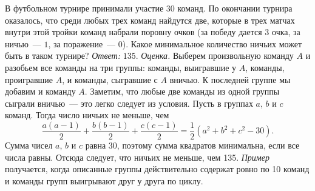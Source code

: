 \problem
В футбольном турнире принимали участие $30$ команд.
По окончании турнира оказалось, что среди любых трех команд найдутся две,
которые в трех матчах внутри этой тройки команд набрали поровну очков
(за победу дается $3$ очка, за ничью~--- $1$, за поражение~--- $0$).
Какое минимальное количество ничьих может быть в таком турнире?
\solution
\emph{Ответ:} $135$.
\emph{Оценка.}
Выберем произвольную команду $A$ и разобьем все команды на три группы:
команды, выигравшие у $A$, команды, проигравшие $A$, и команды, сыгравшие с
$A$ вничью.
К последней группе мы добавим и команду $A$.
Заметим, что любые две команды из одной группы сыграли вничью~--- это легко
следует из условия.
Пусть в группах $a$, $b$ и $c$ команд.
Тогда число ничьих не меньше, чем
\[
    \dfrac{a (a - 1)}{2} +
    \dfrac{b (b - 1)}{2} +
    \dfrac{c (c - 1)}{2}
=
    \dfrac{1}{2}(a^2 + b^2 + c^2 - 30)
.\]
Сумма чисел $a$, $b$ и $c$ равна 30, поэтому сумма квадратов минимальна, если
все числа равны.
Отсюда следует, что ничьих не меньше, чем 135.
\emph{Пример} получается, когда описанные группы действительно содержат ровно по 10
команд и команды групп выигрывают друг у друга по циклу.
\endproblem
